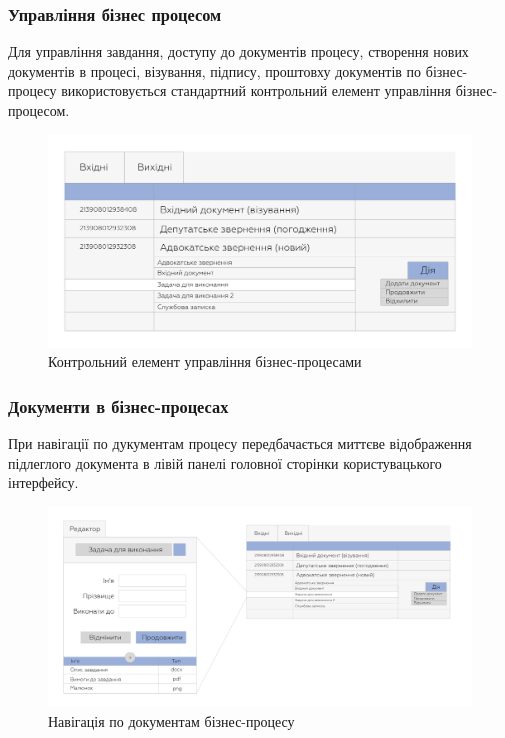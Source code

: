 \newpage
\subsubsection{Управління бізнес процесом}

Для управління завдання, доступу до документів процесу, створення нових документів в процесі,
візування, підпису, проштовху документів по бізнес-процесу використовується стандартний
контрольний елемент управління бізнес-процесом.

\begin{figure}[!htbp]
\centerline{\includegraphics[scale=0.3]{bpeControl.png}}
\caption{Контрольний елемент управління бізнес-процесами}
\end{figure}

\subsubsection{Документи в бізнес-процесах}

При навігації по дукументам процесу передбачається миттєве відображення підлеглого
документа в лівій панелі головної сторінки користувацького інтерфейсу.

\begin{figure}[!htbp]
\centerline{\includegraphics[scale=0.4]{searchBpe.png}}
\caption{Навігація по документам бізнес-процесу}
\end{figure}

